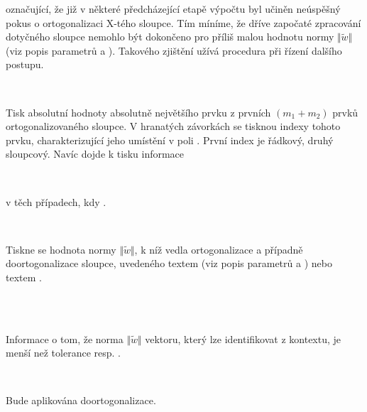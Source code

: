{\noindent
označující, že již v některé předcházející etapě výpočtu byl učiněn
neúspěšný pokus o ortogonalizaci X-tého sloupce. Tím míníme, že dříve
započaté zpracování dotyčného sloupce nemohlo být dokončeno pro příliš
malou hodnotu normy $\Vert\widetilde w\Vert$ (viz popis
parametrů  a ). Takového zjištění užívá procedura
při řízení dalšího postupu.

\begin{Minipage}
\\
\end{Minipage}

\noindent
Tisk absolutní hodnoty absolutně největšího prvku z prvních
$(m_1 + m_2)$ prvků ortogonalizovaného sloupce. V hranatých
závorkách se tisknou indexy tohoto prvku, charakterizující jeho
umístění v poli . První index je řádkový, druhý sloupcový.
Navíc dojde k tisku informace 

\begin{Minipage}
\\
\end{Minipage}

\noindent
v těch případech, kdy .


\begin{Minipage}
\\
\end{Minipage}
%
Tiskne se hodnota normy $\Vert\widetilde w\Vert$, k níž vedla
ortogonalizace a případně doortogonalizace sloupce, uvedeného textem
 (viz popis parametrů  a )
nebo textem .


\begin{Minipage}
\\
\\
\end{Minipage}
%
Informace o tom, že norma $\Vert\widetilde w\Vert$ vektoru,
který lze identifikovat z kontextu, je menší než tolerance
 resp. .


\begin{Minipage}
\\
\end{Minipage}
%
Bude aplikována doortogonalizace.


}
